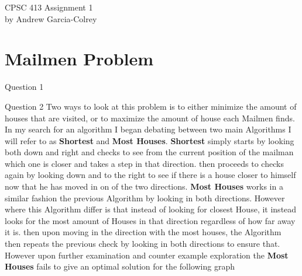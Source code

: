 \documentclass[11pt]{article}
\author{Andrew}
\date{text }
\begin{document}
\begin{center}
CPSC 413 Assignment 1 \\
by Andrew Garcia-Colrey
\end{center}
\part{Mailmen Problem}
Question 1
\begin{center}
\end{center}
Question 2
\hfill \break
\break
Two ways to look at this problem is to either minimize the amount of houses that are visited, or to maximize the amount of house each Mailmen finds. In my search for an algorithm I began debating between two main Algorithms I will refer to as \textbf{Shortest}  and \textbf{Most Houses}. 
\hfill \break
\break
\textbf{Shortest} simply starts by looking both down and right and checks to see from the current position of the mailman which one is closer and takes a step in that direction. then proceeds to checks again by looking down and to the right to see if there is a house closer to himself now that he has moved in on of the two directions.
\hfill \break
\break
 \textbf{Most Houses} works in a similar fashion the previous Algorithm by looking in both directions. However where this Algorithm differ is that instead of looking for closest House, it instead looks for the most amount of Houses in that direction regardless of how far away it is. then upon moving in the direction with the most houses, the Algorithm then repeats the previous check by looking in both directions to ensure that.
 \hfill \break
\break
However upon further examination and counter example exploration the  \textbf{Most Houses} fails to give an optimal solution for the following graph
\end{document}
